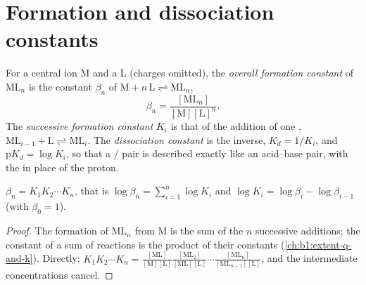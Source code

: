 \section{Formation and dissociation constants}

\begin{definition}\label{def:b1:complexation:formation-constant}
For a central ion M and a  L (charges omitted), the \emph{overall
formation constant} of
$\mathrm{ML}_n$ is the constant $\beta_n$ of
$\mathrm{M} + n\,\mathrm{L} \rightleftharpoons \mathrm{ML}_n$,
\[
  \beta_n = \frac{[\mathrm{ML}_n]}{[\mathrm{M}][\mathrm{L}]^n} .
\]
The \emph{successive formation constant}
$K_i$ is that of the addition of one ,
$\mathrm{ML}_{i-1} + \mathrm{L} \rightleftharpoons \mathrm{ML}_i$. The
\emph{dissociation constant} is the
inverse, $K_d = 1/K_i$, and $\mathrm{p}K_d = \log K_i$, so that a
/ pair is described exactly like an acid--base pair, with
the  in place of the proton.
\end{definition}

\begin{proposition}\label{prop:b1:complexation:beta-k}
$\beta_n = K_1 K_2 \cdots K_n$, that is
$\log\beta_n = \sum_{i=1}^n \log K_i$ and $\log K_i = \log\beta_i -
\log\beta_{i-1}$ (with $\beta_0 = 1$).
\end{proposition}

\begin{proof}
The formation of $\mathrm{ML}_n$ from M is the sum of the $n$ successive
additions; the constant of a sum of reactions is the product of their
constants (\cref{ch:b1:extent-q-and-k}). Directly:
$K_1 K_2\cdots K_n = \frac{[\mathrm{ML}]}{[\mathrm{M}][\mathrm{L}]}
\frac{[\mathrm{ML_2}]}{[\mathrm{ML}][\mathrm{L}]}\cdots
\frac{[\mathrm{ML}_n]}{[\mathrm{ML}_{n-1}][\mathrm{L}]}$, and the
intermediate concentrations cancel.
\end{proof}

